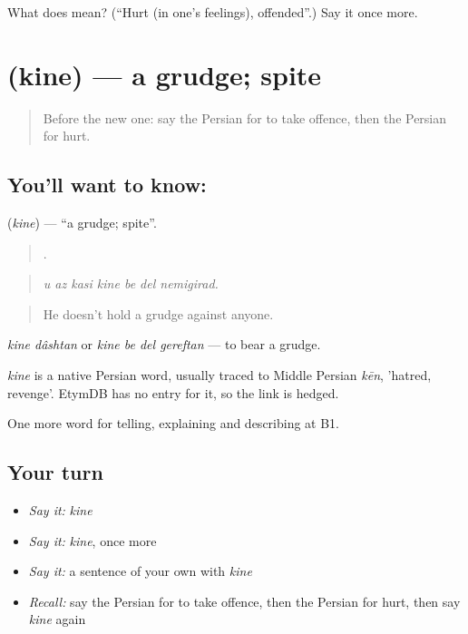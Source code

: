 \begin{tcolorbox}[breakable,colback=teal!4,colframe=teal!35!black,title={Before you move on}]
What does  mean? (\textquotedblleft{}Hurt (in one's feelings), offended\textquotedblright{}.) Say it once more.
\end{tcolorbox}
\section[\texorpdfstring{\fa{کینه} (kine)}{کینه (kine)}]{ (kine) — a grudge; spite}

\label{lesson:FA-C482-kine}



\begin{quote}
Before the new one: say the Persian for to take offence, then the Persian for hurt.
\end{quote}

\subsection*{You'll want to know: }
\textbf{} (\emph{kine}) — \textquotedblleft{}a grudge; spite\textquotedblright{}.

\begin{quote}
      .
\end{quote}

\begin{quote}
\emph{u az kasi kine be del nemigirad.}
\end{quote}

\begin{quote}
He doesn't hold a grudge against anyone.
\end{quote}

\emph{kine dâshtan} or \emph{kine be del gereftan} — to bear a grudge.

\begin{cousinweb}
\emph{kine} is a native Persian word, usually traced to Middle Persian \emph{kēn}, 'hatred, revenge'. EtymDB has no entry for it, so the link is hedged.
\end{cousinweb}

\begin{grammarlens}[title={What you've built}]
One more word for telling, explaining and describing at B1.
\end{grammarlens}

\subsection*{Your turn}
\begin{itemize}
\raggedright
  \item \emph{Say it:} \emph{kine}
  \item \emph{Say it:} \emph{kine}, once more
  \item \emph{Say it:} a sentence of your own with \emph{kine}
  \item \emph{Recall:} say the Persian for to take offence, then the Persian for hurt, then say \emph{kine} again
\end{itemize}

